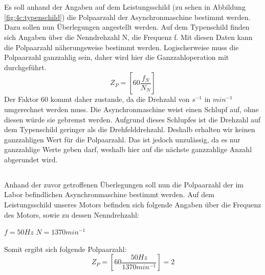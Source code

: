 \chapter{}
\section{}
Es soll anhand der Angaben auf dem Leistungsschild (zu sehen in Abbildung \ref{fig:4c:typenschild}) die Polpaarzahl der Asynchronmaschine bestimmt werden. Dazu sollen nun Überlegungen angestellt werden. Auf dem Typenschild finden sich Angaben über die Nenndrehzahl N, die Frequenz f. Mit diesen Daten kann die Polpaarzahl näherungsweise bestimmt werden. Logischerweise muss die Polpaarzahl ganzzahlig sein, daher wird hier die Ganzzahloperation mit durchgeführt.
\begin{equation}
	Z_{P} = \left[60\frac{f_{N}}{N_{N}}\right]
\end{equation}
Der Faktor 60 kommt daher zustande, da die Drehzahl von $ s^{-1} $ in $ min^{-1} $ umgerechnet werden muss. Die Asynchronmaschine weist einen Schlupf auf, ohne diesen würde sie gebremst werden. Aufgrund dieses Schlupfes ist die Drehzahl auf dem Typenschild geringer als die Drehfelddrehzahl. Deshalb erhalten wir keinen ganzzahligen Wert für die  Polpaarzahl. Das ist jedoch unzulässig, da es nur ganzzahlige Werte geben darf, weshalb hier auf die nächste ganzzahlige Anzahl abgerundet wird.

\section{}
Anhand der zuvor getroffenen Überlegungen soll nun die Polpaarzahl der im Labor befindlichen Asynchronmaschine bestimmt werden. Auf dem Leistungsschild unseres Motors befinden sich folgende Angaben über die Frequenz des Motors, sowie zu dessen Nenndrehzahl:
\begin{center}
	$ f = 50Hz $ \hspace{2cm} $ N = 1370min^{-1} $
\end{center}
Somit ergibt sich folgende Polpaarzahl:
\begin{equation}
	Z_{P} = \left[60\frac{50Hz}{1370min^{-1}}\right] = 2
\end{equation}

